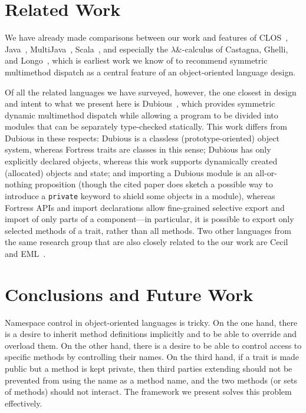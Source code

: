 \section{Related Work}

We have already made comparisons between our work
and features of CLOS~\cite{ECOOP87-CLOS,CLOS-SPECIFICATION,CLTL2,CACM-CLOS}, Java~\cite{JLS1},
MultiJava~\cite{MULTIJAVA-OOPSLA-2000,MULTIJAVA-TOPLAS-2006},
Scala~\cite{SCALA-ABSTRACTIONS},
and especially the
$\lambda\&$-calculus of Castagna, Ghelli, and Longo~\cite{LFP92-OVERLOADED-FUNCTIONS-WITH-SUBTYPING},
which is earliest work we know of to recommend symmetric multimethod dispatch
as a central feature of an object-oriented language design.

Of all the related languages we have surveyed, however, the one closest in design and intent to what
we present here is Dubious~\cite{MODULAR-STATICALLY-TYPED-MULTIMETHODS},
which provides symmetric dynamic multimethod dispatch while allowing
a program to be divided into modules that can be separately type-checked statically.
This work differs from Dubious in these respects: Dubious is a classless (prototype-oriented)
object system, whereas Fortress traits are classes in this sense;
Dubious has only explicitly declared objects, whereas this work supports dynamically
created (allocated) objects and state;
and importing a Dubious module is an all-or-nothing proposition (though the cited paper
does sketch a possible way to introduce a {\tt private} keyword to shield some objects
in a module),
whereas Fortress APIs and import declarations allow fine-grained selective export and import
of only parts of a component---in particular, it is possible to export only selected
methods of a trait, rather than all methods.
Two other languages from the same research group that are also closely related
to the our work are Cecil~\cite{CECIL-MULTIMETHODS,CECIL-REPORT-1993,CECIL-REPORT-2004}
and EML~\cite{TOPLAS-EML-MODULAR-TYPECHECKING}.


\section{Conclusions and Future Work}

Namespace control in object-oriented languages is tricky.  On the one hand,
there is a desire to inherit method definitions implicitly and to
be able to override and overload them.  On the other hand, there is a desire
to be able to control access to specific methods by controlling their names.
On the third hand, if a trait  is made public but a method  is kept private,
then third parties extending  should not be prevented from using the name
 as a method name, and the two methods (or sets of methods) should not interact.
The framework we present solves this problem effectively.

